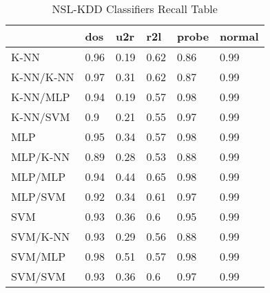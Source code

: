 \begin{table}[H]
\centering
\caption{NSL-KDD Classifiers Recall Table}
\label{nslrecalltable}
\begin{tabular}{@{}llllll@{}}
\toprule
          & dos  & u2r  & r2l  & probe & normal \\ \midrule
K-NN      & 0.96 & 0.19 & 0.62 & 0.86  & 0.99   \\
K-NN/K-NN & 0.97 & 0.31 & 0.62 & 0.87  & 0.99   \\
K-NN/MLP  & 0.94 & 0.19 & 0.57 & 0.98  & 0.99   \\
K-NN/SVM  & 0.9  & 0.21 & 0.55 & 0.97  & 0.99   \\
MLP       & 0.95 & 0.34 & 0.57 & 0.98  & 0.99   \\
MLP/K-NN  & 0.89 & 0.28 & 0.53 & 0.88  & 0.99   \\
MLP/MLP   & 0.94 & 0.44 & 0.65 & 0.98  & 0.99   \\
MLP/SVM   & 0.92 & 0.34 & 0.61 & 0.97  & 0.99   \\
SVM       & 0.93 & 0.36 & 0.6  & 0.95  & 0.99   \\
SVM/K-NN  & 0.93 & 0.29 & 0.56 & 0.88  & 0.99   \\
SVM/MLP   & 0.98 & 0.51 & 0.57 & 0.98  & 0.99   \\
SVM/SVM   & 0.93 & 0.36 & 0.6  & 0.97  & 0.99   \\ \bottomrule
\end{tabular}
\end{table}
